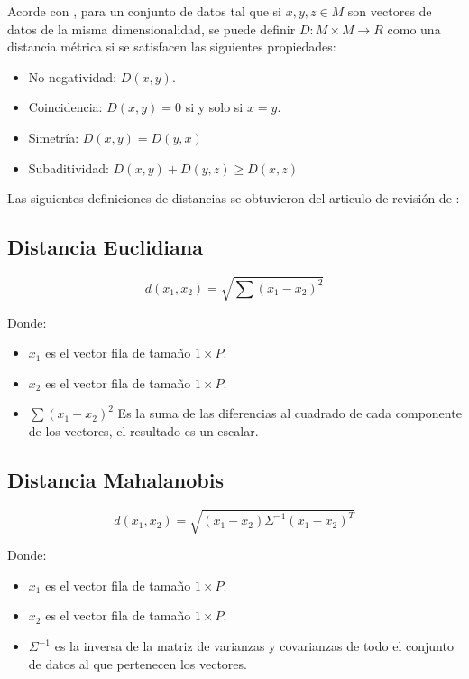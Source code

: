 \documentclass[11pt, letterpaper]{article}
\begin{document}
Acorde con \cite{wang_survey_2015}, para un conjunto de datos tal que si $x,y,z \in M$ son vectores de datos de la misma dimensionalidad, se puede definir $D: M\times M \rightarrow R$ como una distancia métrica si se satisfacen las siguientes propiedades:


\begin{itemize}
	\item No negatividad: $D(x,y)$.
	
	\item Coincidencia: $D(x,y) = 0$ si y solo si $x = y$.
	
	\item Simetría: $D(x,y) = D(y,x)$
	
	\item Subaditividad: $D(x,y) + D(y,z) \geq D(x,z)$
	
\end{itemize}

Las siguientes definiciones de distancias se obtuvieron del articulo de revisión de \cite{wang_survey_2015}:


\subsection{Distancia Euclidiana}


$$d(x_1,x_2) = \sqrt{\sum{(x_1-x_2)^2}}$$

Donde:

\begin{itemize}
	\item $x_1$ es el vector fila de tamaño $1\times P$.
	\item $x_2$ es el vector fila de tamaño $1\times P$.
	\item $\sum{(x_1-x_2)^2}$ Es la suma de las diferencias al cuadrado de cada componente de los vectores, el resultado es un escalar. 
\end{itemize}





\subsection{Distancia Mahalanobis}

$$d(x_1,x_2) = \sqrt{(x_1-x_2)\Sigma^{-1}(x_1-x_2)^{T}}$$

Donde:

\begin{itemize}
	\item $x_1$ es el vector fila de tamaño $1\times P$.
	\item $x_2$ es el vector fila de tamaño $1\times P$.
	\item $\Sigma^{-1}$ es la inversa de la matriz de varianzas y covarianzas de todo el conjunto de datos al que pertenecen los vectores. 
\end{itemize}
\end{document}
